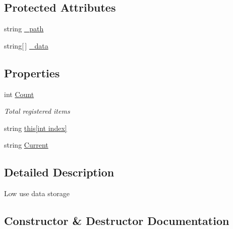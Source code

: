 \subsection*{Protected Attributes}
\begin{DoxyCompactItemize}
\item 
string \hyperlink{class_o_t_a_1_1_misc_1_1_data_register_a8dc234d6ed4b1d3372c9447a5918d524}{\+\_\+path}
\item 
string\mbox{[}$\,$\mbox{]} \hyperlink{class_o_t_a_1_1_misc_1_1_data_register_abb719d38497dfeba3ac96050b88f5bdb}{\+\_\+data}
\end{DoxyCompactItemize}
\subsection*{Properties}
\begin{DoxyCompactItemize}
\item 
int \hyperlink{class_o_t_a_1_1_misc_1_1_data_register_a8ff81a20959ff6ad645a2660b6345edf}{Count}
\begin{DoxyCompactList}\small\item\em Total registered items \end{DoxyCompactList}\item 
string \hyperlink{class_o_t_a_1_1_misc_1_1_data_register_acc9ce0e420a518fa7d183f77c797a974}{this\mbox{[}int index\mbox{]}}
\item 
string \hyperlink{class_o_t_a_1_1_misc_1_1_data_register_a98c85263e49f40d4b96590aaf7682fef}{Current}
\end{DoxyCompactItemize}


\subsection{Detailed Description}
Low use data storage 



\subsection{Constructor \& Destructor Documentation}
\hypertarget{class_o_t_a_1_1_misc_1_1_data_register_ac4437536f525d636878a78c0f9cc67a7}{}
